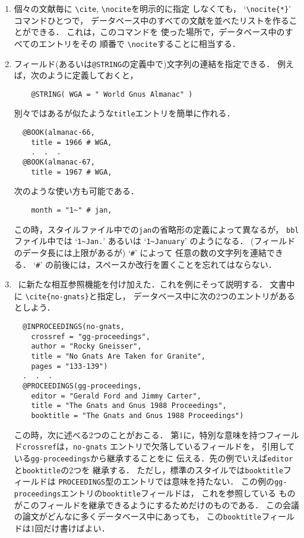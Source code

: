 \begin{enumerate}

\item
個々の文献毎に \verb|\cite|,  \verb|\nocite|を明示的に指定
しなくても， `\verb|\nocite{*}|' コマンドひとつで，
データベース中のすべての文献を並べたリストを作ることができる．
これは，このコマンドを
使った場所で，データベース中のすべてのエントリをその
順番で \verb|\nocite|することに相当する．

\item
\label{concat}
フィールド(あるいは{\tt @STRING}の定義中で)文字列の連結を指定できる．
例えば，次のように定義しておくと，
\begin{verbatim}
    @STRING( WGA = " World Gnus Almanac" )
\end{verbatim}
別々ではあるが似たような{\tt title}エントリを簡単に作れる．
\begin{verbatim}
  @BOOK(almanac-66,
    title = 1966 # WGA,
    .  .  .
  @BOOK(almanac-67,
    title = 1967 # WGA,
\end{verbatim}
次のような使い方も可能である．
\begin{verbatim}
    month = "1~" # jan,
\end{verbatim}
この時，スタイルファイル中での{\tt jan}の省略形の定義によって異なるが，
{\tt bbl}ファイル中では `\verb|1~Jan.|' あるいは
`\verb|1~January|' のようになる．
(フィールドのデータ長には上限があるが) `{\tt\#}' によって
任意の数の文字列を連結できる．
`{\tt\#}' の前後には，スペースか改行を置くことを忘れてはならない．

\item
\BibTeX\ に新たな相互参照機能を付け加えた．これを例にそって説明する．
文書中に \verb|\cite{no-gnats}|と指定し，
データベース中に次の2つのエントリがあるとしよう．
\begin{verbatim}
  @INPROCEEDINGS(no-gnats,
    crossref = "gg-proceedings",
    author = "Rocky Gneisser",
    title = "No Gnats Are Taken for Granite",
    pages = "133-139")
  .  .  .
  @PROCEEDINGS(gg-proceedings,
    editor = "Gerald Ford and Jimmy Carter",
    title = "The Gnats and Gnus 1988 Proceedings",
    booktitle = "The Gnats and Gnus 1988 Proceedings")
\end{verbatim}
この時，次に述べる2つのことがおこる．
第1に，特別な意味を持つフィールド{\tt crossref}は，{\tt no-gnats}
エントリで欠落しているフィールドを，
引用している{\tt gg-proceedings}から継承することを\BibTeX に
伝える．先の例でいえば{\tt editor}と{\tt booktitle}の2つを
継承する．
ただし，標準のスタイルでは{\tt booktitle}フィールドは
{\tt PROCEEDINGS}型のエントリでは意味を持たない．
この例の{\tt gg-proceedings}エントリの{\tt booktitle}フィールドは，
これを参照している
ものがこのフィールドを継承できるようにするためだけのものである．
この会議の論文がどんなに多くデータベース中にあっても，
この{\tt booktitle}フィールドは1回だけ書けばよい．


\end{enumerate}

